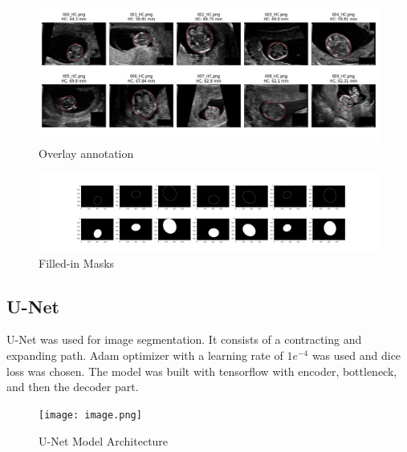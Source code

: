 \documentclass[twocolumn]{article}
\begin{document}
\begin{figure}[H]
    \centering
    \includegraphics[width=1\linewidth]{figures/detect_border.png}
    \caption{Overlay annotation}
    \label{fig:enter-label}
\end{figure}

\begin{figure}[H]
    \centering
    \includegraphics[width=1\linewidth]{figures/Fill-in Mask.png}
    \caption{Filled-in Masks}
    \label{fig:enter-label}
\end{figure}

\subsection{U-Net}
U-Net \cite{ronneberger2015u} was used for image segmentation. It consists of a contracting and expanding path. Adam optimizer with a learning rate of $1e^{-4}$ was used and dice loss was chosen. The model was built with tensorflow with encoder, bottleneck, and then the decoder part.

\begin{figure}
    \centering
    \texttt{[image: image.png]}
    \caption{U-Net Model Architecture}
    \label{fig:enter-label}
\end{figure}
\end{document}
